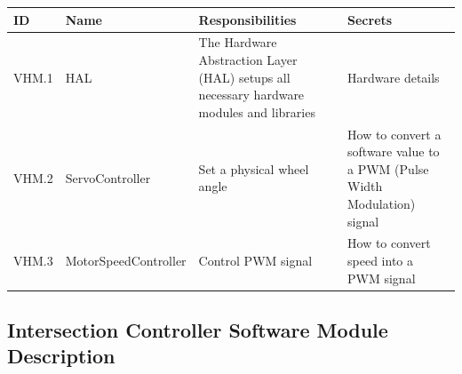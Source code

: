 \documentclass [10pt]{article}
\begin{document}
\begin{longtable}{ |p{ }  | p{ } |  p{ } |  p{ } |}  \hline
    
    \textbf{ID} & \textbf{Name} &  \textbf{Responsibilities} & \textbf{Secrets} \\ \hline 
    
    
   VHM.1  & HAL & The Hardware Abstraction Layer (HAL) setups all necessary hardware modules and libraries &  Hardware details \\ \hline
    
    
    \cellcolor{tableCell}VHM.2  & \cellcolor{tableCell}ServoController & \cellcolor{tableCell}Set a physical wheel angle & 
    \cellcolor{tableCell}How to convert a software value to a PWM (Pulse Width Modulation) signal \\ \hline
    
    VHM.3 & MotorSpeedController & Control PWM signal & How to convert speed into a PWM signal \\ \hline\hline
    
\end{longtable}




\subsection{Intersection Controller Software Module Description}





\end{document}
